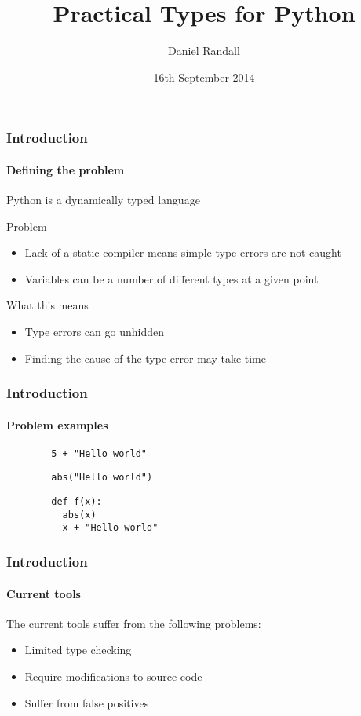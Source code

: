 \documentclass{beamer}
\title{Practical Types for Python}
\author{Daniel Randall}
\institute{Imperial College London} %
\date{16th September 2014}
\begin{document}
	\frame{\titlepage}

\begin{frame}
    \frametitle{Introduction}
   	\framesubtitle{Defining the problem}
   	Python is a dynamically typed language
   	\begin{block}{Problem}
   		\begin{itemize}
   		  \item Lack of a static compiler means simple type errors are not caught
   		  \item Variables can be a number of different types at a given point
   		\end{itemize}
   	\end{block}

	\begin{block}{What this means}
		\begin{itemize}
		  \item Type errors can go unhidden
		  \item Finding the cause of the type error may take time
		\end{itemize}
   	\end{block}
\end{frame}	
	
\begin{frame}[fragile]
    \frametitle{Introduction}
   	\framesubtitle{Problem examples}
   	\begin{lstlisting}
        5 + "Hello world"
    \end{lstlisting}
   	\begin{lstlisting}
        abs("Hello world")
    \end{lstlisting}
    \begin{lstlisting}
        def f(x):
          abs(x)
          x + "Hello world"
    \end{lstlisting}
\end{frame}
  
  \begin{frame}
    \frametitle{Introduction}
   	\framesubtitle{Current tools}
   	The current tools  suffer from the following problems:
   	\begin{itemize}
    		\item Limited type checking
    		\item Require modifications to source code
    		\item Suffer from false positives
    \end{itemize}
  \end{frame}
  
\end{document}
